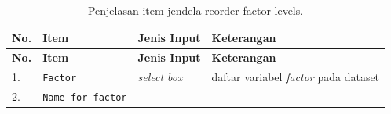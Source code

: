 \documentclass[12pt,]{krantz}
\begin{document}
\begin{longtable}[]{@{}llll@{}}
\caption{\label{tab:reofac} Penjelasan item jendela reorder factor levels.}\tabularnewline
\toprule
\begin{minipage}[b]{0.04\columnwidth}\raggedright
\textbf{No.}\strut
\end{minipage} & \begin{minipage}[b]{0.14\columnwidth}\raggedright
\textbf{Item}\strut
\end{minipage} & \begin{minipage}[b]{0.09\columnwidth}\raggedright
\textbf{Jenis Input}\strut
\end{minipage} & \begin{minipage}[b]{0.61\columnwidth}\raggedright
\textbf{Keterangan}\strut
\end{minipage}\tabularnewline
\midrule
\endfirsthead
\toprule
\begin{minipage}[b]{0.04\columnwidth}\raggedright
\textbf{No.}\strut
\end{minipage} & \begin{minipage}[b]{0.14\columnwidth}\raggedright
\textbf{Item}\strut
\end{minipage} & \begin{minipage}[b]{0.09\columnwidth}\raggedright
\textbf{Jenis Input}\strut
\end{minipage} & \begin{minipage}[b]{0.61\columnwidth}\raggedright
\textbf{Keterangan}\strut
\end{minipage}\tabularnewline
\midrule
\endhead
\begin{minipage}[t]{0.04\columnwidth}\raggedright
1.\strut
\end{minipage} & \begin{minipage}[t]{0.14\columnwidth}\raggedright
\texttt{Factor}\strut
\end{minipage} & \begin{minipage}[t]{0.09\columnwidth}\raggedright
\emph{select box}\strut
\end{minipage} & \begin{minipage}[t]{0.61\columnwidth}\raggedright
daftar variabel \emph{factor} pada dataset\strut
\end{minipage}\tabularnewline
\begin{minipage}[t]{0.04\columnwidth}\raggedright
2.\strut
\end{minipage} & \begin{minipage}[t]{0.14\columnwidth}\raggedright
\texttt{Name\ for\ factor}\strut
\end{minipage} & \begin{minipage}[t]{0.09\columnwidth}\raggedright

\end{minipage}
\end{longtable}
\end{document}
